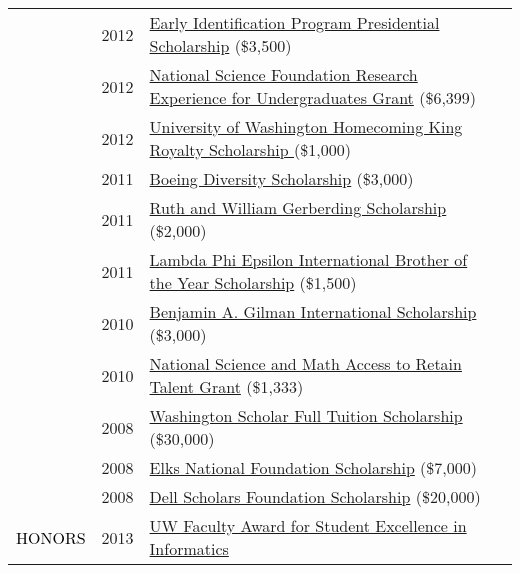 \documentclass[12pt]{article}
\begin{document}
{{\begin{longtable}{Rp{1.0in}p{0.25in}p{4.75in}}
& \footnotesize{2012} & \href{http://depts.washington.edu/eip/}{{Early Identification Program Presidential Scholarship}} (\$3,500) \\

& \footnotesize{2012} & \href{http://www.nsf.gov/crssprgm/reu/}{{National Science Foundation Research Experience for Undergraduates Grant}} (\$6,399) \\

& \footnotesize{2012} & \href{http://www.washington.edu/uaa/2013/06/28/oh-the-places-theyll-go-new-grads-and-their-plans/bryan-dosono/}{{University of Washington Homecoming King Royalty Scholarship }}(\$1,000) \\

& \footnotesize{2011} & \href{https://ischool.uw.edu/news/2012/04/bryan-dosono-informatics-student-speaks-boeing-scholarship-breakfast}{{Boeing Diversity Scholarship}} (\$3,000) \\

& \footnotesize{2011} & \href{http://www.washington.edu/omad/2011/05/17/assunta-ng-student-scholars-honored-at-41st-annual-eop-celebration/}{{Ruth and William Gerberding Scholarship}} (\$2,000) \\

& \footnotesize{2011} & \href{http://lambdaphiepsilon.com/resources/\#academicachievement}{{Lambda Phi Epsilon International Brother of the Year Scholarship}} (\$1,500) \\

& \footnotesize{2010} & \href{http://depts.washington.edu/uwhonors/news/brief/?id=61}{{Benjamin A. Gilman International Scholarship}} (\$3,000) \\

& \footnotesize{2010} & \href{http://www2.ed.gov/programs/smart/index.html}{{National Science and Math Access to Retain Talent Grant}} (\$1,333) \\

& \footnotesize{2008} & \href{http://www.wsac.wa.gov/}{{Washington Scholar Full Tuition Scholarship}} (\$30,000) \\

& \footnotesize{2008} & \href{http://www.elks.org/enf/scholars/}{{Elks National Foundation Scholarship}} (\$7,000) \\

& \footnotesize{2008} & \href{https://www.dellscholars.org/}{{Dell Scholars Foundation Scholarship}} (\$20,000) \\

\textcolor{black}{\footnotesize{\uppercase{Honors}}} & \footnotesize{2013} & \href{https://ischool.uw.edu/feature-stories/2013-ischool-convocation-celebrates-achievement-and-community}{{UW Faculty Award for Student Excellence in Informatics}} \\


\end{longtable}}}
\end{document}
